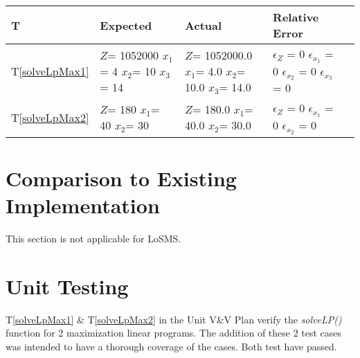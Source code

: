 \documentclass[12pt, titlepage]{article}
\newcommand{\famname}{LoSMS}
\begin{document}
\noindent
\begin{tabularx}{\textwidth}{p{1.5cm}p{3cm}p{4.5cm}p{6cm}X}
	\toprule {\bf T} & {\bf Expected} & {\bf Actual} & {\bf Relative Error}\\
	\midrule
	T\ref{solveLpMax1} & $Z$= 1052000 \newline
	$x_1$= 4 \newline
	$x_2$= 10 \newline
	$x_3$= 14 \newline
	& $Z$= 1052000.0 \newline
	$x_1$= 4.0 \newline
	$x_2$= 10.0 \newline
	$x_3$= 14.0 \newline 
	& $\epsilon_Z$ = 0 \newline
	$\epsilon_{x_1}$ = 0 \newline 
	$\epsilon_{x_2}$ = 0 \newline 
	$\epsilon_{x_3}$ = 0 \newline  
	\\
	T\ref{solveLpMax2} & $Z$= 180 \newline
	$x_1$= 40 \newline
	$x_2$= 30 \newline
	&$Z$= 180.0 \newline
	$x_1$= 40.0 \newline
	$x_2$= 30.0 \newline
	& $\epsilon_Z$ = 0 \newline
	$\epsilon_{x_1}$ = 0 \newline 
	$\epsilon_{x_2}$ =  0\newline
	\\
	\bottomrule
\end{tabularx}
	
\section{Comparison to Existing Implementation}	 \label{Comparison}

This section is not applicable for \famname{}.

\section{Unit Testing} \label{unitTesting}

T\ref{solveLpMax1} \& T\ref{solveLpMax2} in the Unit V\&V Plan verify the 
\textit{solveLP()} function for 2 maximization linear programs. The addition of 
these 2 test cases was intended to have a thorough coverage of the cases. Both 
test have passed.\\
\end{document}
